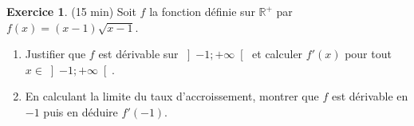 \documentclass{exam}
\theoremstyle{definition}
\newtheorem{exercice}{Exercice}
\begin{document}

\begin{exercice}{(15 min)}
    Soit $f$ la fonction définie sur $\mathbb{R}^+$ par $f(x) = (x-1)\sqrt{x-1}$.
    \begin{enumerate}
        \item Justifier que $f$ est dérivable sur $\left]-1; +\infty\right[$ et calculer $f'(x)$ pour tout $x \in \left]-1; +\infty\right[$.
        \item En calculant la limite du taux d'accroissement, montrer que $f$ est dérivable en $-1$ puis en déduire $f'(-1)$.
    \end{enumerate}
    \end{exercice}
    
\end{document}
